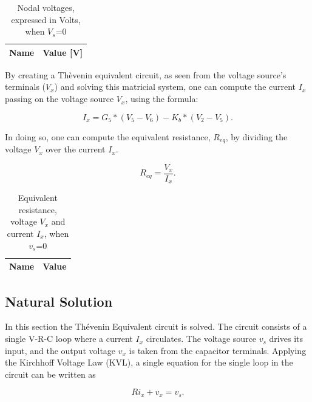 \begin{table} [H]
  \centering
  \begin{tabular}{|l|r|}
    \hline    
    {\bf Name} & {\bf Value [V]} \\ \hline
    
  \end{tabular}
  \caption{Nodal voltages, expressed in Volts, when $V_s$=0}
  \label{tab:volt2}
\end{table}

By creating a Thèvenin equivalent circuit, as seen from the voltage source's
terminals ($V_x$) and solving this matricial system, one can compute the current
$I_x$ passing on the voltage source $V_x$, using the formula:\par

\begin{equation}
  I_x = G_5 * (V_5 - V_6) - K_b * (V_2 - V_5).
  \label{eq:Ix}
\end{equation}

In doing so, one can compute the equivalent resistance, $R_{eq}$, by dividing the
voltage $V_x$ over the current $I_x$.

\begin{equation}
  R_{eq} = \frac{V_x}{I_x}.
  \label{eq:R_eq}
\end{equation}

\begin{table} [H]
  \centering
  \begin{tabular}{|l|r|}
    \hline    
    {\bf Name} & {\bf Value} \\ \hline
    
  \end{tabular}
  \caption{Equivalent resistance, voltage $V_x$ and current $I_x$, when $v_s$=0}
  \label{tab:req}
\end{table}



\subsection{Natural Solution}
\label{subsec:natural solution}

In this section the Thévenin Equivalent circuit is solved.
The circuit consists of a single V-R-C loop where a current $I_{x}$ circulates. The
voltage source $v_s$ drives its input, and the output voltage $v_x$ is taken from
the capacitor terminals. Applying the Kirchhoff Voltage Law (KVL), a single
equation for the single loop in the circuit can be written as

\begin{equation}
  Ri_{x} + v_{x} = v_{s}.
  \label{eq:kvl}
\end{equation}

